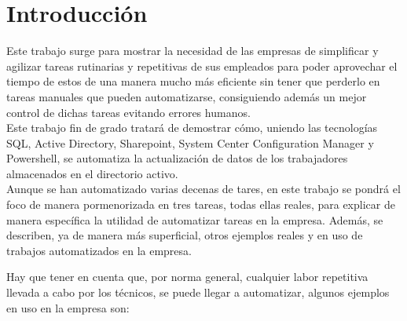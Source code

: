 \documentclass[a4paper, 12pt]{book}
\begin{document}
\tableofcontents 
\cleardoublepage
\listoffigures %



\cleardoublepage
\chapter{Introducción}
\label{sec:intro} %

Este trabajo surge para mostrar la necesidad de las empresas de simplificar y agilizar tareas rutinarias y repetitivas de sus empleados para poder aprovechar el tiempo de estos de una manera mucho más eficiente sin tener que perderlo en tareas manuales que pueden automatizarse, consiguiendo además un mejor control de dichas tareas evitando errores humanos.
\\

Este trabajo fin de grado tratará de demostrar cómo, uniendo las tecnologías SQL, Active Directory, Sharepoint, System Center Configuration Manager y Powershell, se automatiza la actualización de datos de los trabajadores almacenados en el directorio activo.
\\

Aunque se han automatizado varias decenas de tares, en este trabajo se pondrá el foco de manera pormenorizada en tres tareas, todas ellas reales, para explicar de manera específica la utilidad de automatizar tareas en la empresa. Además, se describen, ya de manera más superficial, otros ejemplos reales y en uso de trabajos automatizados en la empresa. 

Hay que tener en cuenta que, por norma general, cualquier labor repetitiva llevada a cabo por los técnicos, se puede llegar a automatizar, algunos ejemplos en uso en la empresa son:
\end{document}
